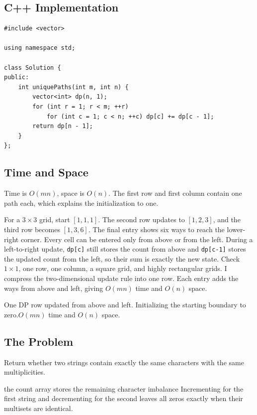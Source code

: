 \subsection{C++ Implementation}
\begin{lstlisting}[style=compactcode,caption={Complete C++ solution: Unique Paths}]
#include <vector>

using namespace std;

class Solution {
public:
    int uniquePaths(int m, int n) {
        vector<int> dp(n, 1);
        for (int r = 1; r < m; ++r)
            for (int c = 1; c < n; ++c) dp[c] += dp[c - 1];
        return dp[n - 1];
    }
};
\end{lstlisting}

\subsection{Time and Space}
Time is \(O(mn)\), space is \(O(n)\). The first row and first column contain
one path each, which explains the initialization to one.

\lessonexpansion
  {For a \(3\times3\) grid, start \([1,1,1]\). The second row updates to
   \([1,2,3]\), and the third row becomes \([1,3,6]\). The final entry shows
   six ways to reach the lower-right corner.}
  {Every cell can be entered only from above or from the left. During a
   left-to-right update, \texttt{dp[c]} still stores the count from above and
   \texttt{dp[c-1]} stores the updated count from the left, so their sum is
   exactly the new state.}
  {Check \(1\times1\), one row, one column, a square grid, and highly
   rectangular grids.}
  {I compress the two-dimensional update rule into one row. Each entry adds
   the ways from above and left, giving \(O(mn)\) time and \(O(n)\) space.}

  {One DP row updated from above and left.}
  {Initializing the starting boundary to zero.}{$O(mn)$ time and $O(n)$ space.}



\subsection{The Problem}
Return whether two strings contain exactly the same characters with the same
multiplicities.

\begin{invariantbox}{the count array stores the remaining character imbalance}
Incrementing for the first string and decrementing for the second leaves all
zeros exactly when their multisets are identical.
\end{invariantbox}

